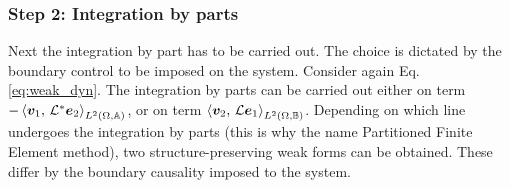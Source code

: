 {\centering \subsubsection*{Step 2: Integration by parts}} 
Next the integration by part has to be carried out. The choice is dictated by the boundary control to be imposed on the system. Consider again Eq. \eqref{eq:weak_dyn}. The integration by parts can be carried out either on term $-\inner[L^2(\Omega, \mathbb{A})]{\bm{v}_1}{\mathcal{L}^*\bm{e}_2}$, or on term $\inner[L^2(\Omega, \mathbb{B})]{\bm{v}_2}{\mathcal{L}\bm{e}_1}$. Depending on which line undergoes the integration by parts (this is why the name Partitioned Finite Element method), two structure-preserving weak forms can be obtained. These differ by the boundary causality imposed to the system. 


